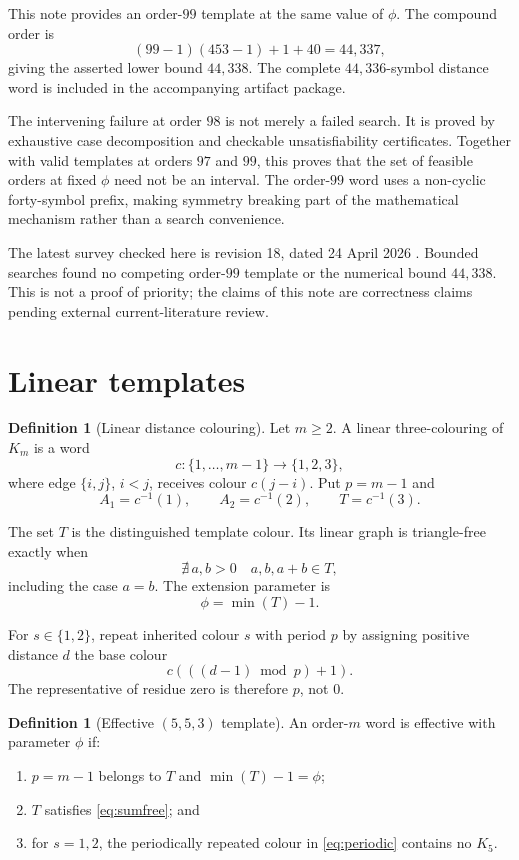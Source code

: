 \documentclass[11pt]{article}
\theoremstyle{definition}
\newtheorem{definition}[theorem]{Definition}
\theoremstyle{remark}
\begin{document}
This note provides an order-$99$ template at the same value of $\phi$.
The compound order is
\[
  (99-1)(453-1)+1+40=44{,}337,
\]
giving the asserted lower bound $44{,}338$. The complete $44{,}336$-symbol
distance word is included in the accompanying artifact package.

The intervening failure at order $98$ is not merely a failed search.
It is proved by exhaustive case decomposition and checkable
unsatisfiability certificates. Together with valid templates at orders $97$
and $99$, this proves that the set of feasible orders at fixed $\phi$ need
not be an interval. The order-$99$ word uses a non-cyclic forty-symbol
prefix, making symmetry breaking part of the mathematical mechanism rather
than a search convenience.

The latest survey checked here is revision 18, dated 24 April 2026
\cite{radziszowski}. Bounded searches found no competing order-$99$
template or the numerical bound $44{,}338$. This is not a proof of priority;
the claims of this note are correctness claims pending external
current-literature review.

\section{Linear templates}

\begin{definition}[Linear distance colouring]
Let $m\ge2$. A linear three-colouring of $K_m$ is a word
\[
  c:\{1,\ldots,m-1\}\longrightarrow\{1,2,3\},
\]
where edge $\{i,j\}$, $i<j$, receives colour $c(j-i)$. Put
$p=m-1$ and
\[
  A_1=c^{-1}(1),\qquad A_2=c^{-1}(2),\qquad T=c^{-1}(3).
\]
\end{definition}

The set $T$ is the distinguished template colour. Its linear graph is
triangle-free exactly when
\begin{equation}
  \nexists\,a,b>0\quad a,b,a+b\in T,
  \label{eq:sumfree}
\end{equation}
including the case $a=b$. The extension parameter is
\[
  \phi=\min(T)-1.
\]

For $s\in\{1,2\}$, repeat inherited colour $s$ with period $p$ by assigning
positive distance $d$ the base colour
\begin{equation}
  c\!\left(((d-1)\bmod p)+1\right).
  \label{eq:periodic}
\end{equation}
The representative of residue zero is therefore $p$, not $0$.

\begin{definition}[Effective $(5,5,3)$ template]
An order-$m$ word is effective with parameter $\phi$ if:
\begin{enumerate}
  \item $p=m-1$ belongs to $T$ and $\min(T)-1=\phi$;
  \item $T$ satisfies \eqref{eq:sumfree}; and
  \item for $s=1,2$, the periodically repeated colour in
  \eqref{eq:periodic} contains no $K_5$.
\end{enumerate}
\end{definition}
\end{document}
